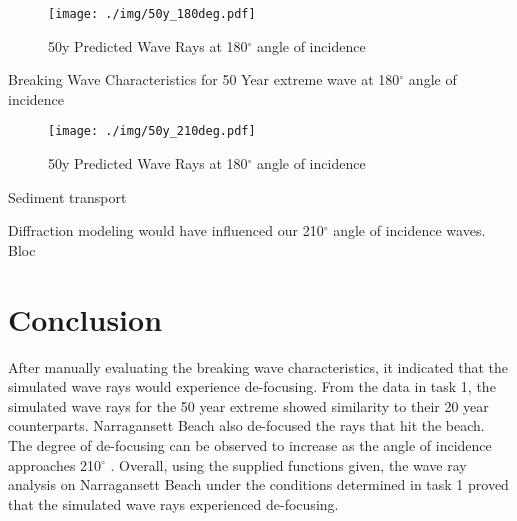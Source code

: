 \begin{figure}[H]
\centering
\texttt{[image: ./img/50y\_180deg.pdf]}
\caption{50y Predicted Wave Rays at 180$^{\circ}$ angle of incidence}
\label{fig:50y180deg}
\end{figure}

\begin{table}[H]
\centering

\caption{Breaking Wave Characteristics for 50 Year extreme wave at 180$^{\circ}$ angle of incidence}
\label{tab:50y_180deg}
\end{table}

\begin{figure}[H]
\centering
\texttt{[image: ./img/50y\_210deg.pdf]}
\caption{50y Predicted Wave Rays at 180$^{\circ}$ angle of incidence}
\label{fig:50y210deg}
\end{figure}

Sediment transport 


Diffraction modeling would have influenced our 210$^{\circ}$ angle of incidence waves. Bloc

\section{Conclusion}
After manually evaluating the breaking wave characteristics, it indicated that the simulated wave rays would experience de-focusing. From the data in task 1, the simulated wave rays for the 50 year extreme showed similarity to their 20 year counterparts. Narragansett Beach also de-focused the rays that hit the beach. The degree of de-focusing can be observed to increase as the angle of incidence approaches 210$^{\circ}$ . Overall, using the supplied functions given, the wave ray analysis on Narragansett Beach under the conditions determined in task 1 proved that the simulated wave rays experienced de-focusing. 




